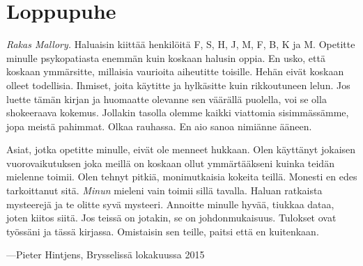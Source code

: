 \chapter{Loppupuhe}\label{postface}

\emph{Rakas Mallory.} Haluaisin kiittää henkilöitä F, S, H, J, M, F, B, K ja M. Opetitte minulle psykopatiasta enemmän kuin koskaan halusin oppia. En usko, että koskaan ymmärsitte, millaisia vaurioita aiheutitte toisille. Hehän eivät koskaan olleet todellisia. Ihmiset, joita käytitte ja hylkäsitte kuin rikkoutuneen lelun. Jos luette tämän kirjan ja huomaatte olevanne sen väärällä puolella, voi se olla shokeeraava kokemus. Jollakin tasolla olemme kaikki viattomia sisimmässämme, jopa meistä pahimmat. Olkaa rauhassa. En aio sanoa nimiänne ääneen.

Asiat, jotka opetitte minulle, eivät ole menneet hukkaan. Olen käyttänyt jokaisen vuorovaikutuksen joka meillä on koskaan ollut ymmärtääkseni kuinka teidän mielenne toimii. Olen tehnyt pitkiä, monimutkaisia kokeita teillä. Monesti en edes tarkoittanut sitä. \emph{Minun} mieleni vain toimii sillä tavalla. Haluan ratkaista mysteerejä ja te olitte syvä mysteeri. Annoitte minulle hyvää, tiukkaa dataa, joten kiitos siitä. Jos teissä on jotakin, se on johdonmukaisuus. Tulokset ovat työssäni ja tässä kirjassa. Omistaisin sen teille, paitsi että en kuitenkaan.

\vspace{0.1in}

\noindent ---Pieter Hintjens, Brysselissä lokakuussa 2015
